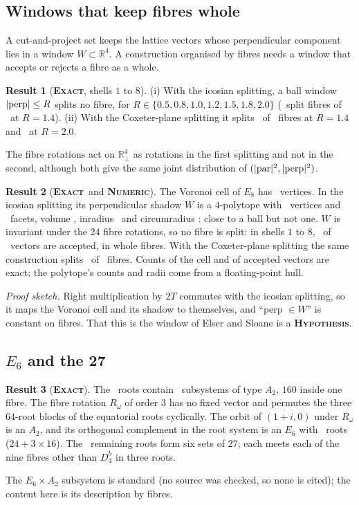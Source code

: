 \documentclass[11pt]{article}
\newcommand{\exact}{\textbf{\textsc{Exact}}}
\newcommand{\numeric}{\textbf{\textsc{Numeric}}}
\newcommand{\hypo}{\textbf{\textsc{Hypothesis}}}
\theoremstyle{definition}
\newtheorem{result}{Result}
\begin{document}
\subsection{Windows that keep fibres whole}\label{sec:windows}
A cut-and-project set keeps the lattice vectors whose perpendicular component lies in a window $W\subset\mathbb{R}^4$. A construction organised by fibres needs a window that accepts or rejects a fibre as a whole.
\begin{result}[\exact, shells $1$ to $8$]\label{res:ball}
(i) With the icosian splitting, a ball window $|{\rm perp}|\le R$ splits no fibre, for $R\in\{0.5,0.8,1.0,1.2,1.5,1.8,2.0\}$ (\qgSplitIcosian\ split fibres of \qgFibreEight\ at $R=1.4$). (ii) With the Coxeter-plane splitting it splits \qgSplitCoxOne\ of \qgFibreEight\ fibres at $R=1.4$ and \qgSplitCoxTwo\ at $R=2.0$.
\end{result}
The fibre rotations act on $\mathbb{R}^4_\perp$ as rotations in the first splitting and not in the second, although both give the same joint distribution of $(|{\rm par}|^2,|{\rm perp}|^2)$.
\begin{result}[\exact\ and \numeric]\label{res:vor}
The Voronoi cell of $E_8$ has \qgVoronoiCellVertices\ vertices. In the icosian splitting its perpendicular shadow $W$ is a $4$-polytope with \qgVoronoiVertices\ vertices and \qgVoronoiFacets\ facets, volume \qgVoronoiVolume, inradius \qgVoronoiIn\ and circumradius \qgVoronoiCirc: close to a ball but not one. $W$ is invariant under the $24$ fibre rotations, so no fibre is split: in shells $1$ to $8$, \qgVorAccepted\ of \qgVecEight\ vectors are accepted, in whole fibres. With the Coxeter-plane splitting the same construction splits \qgVorCoxSplit\ of \qgFibreEight\ fibres. Counts of the cell and of accepted vectors are exact; the polytope's counts and radii come from a floating-point hull.
\end{result}
\emph{Proof sketch.} Right multiplication by $2T$ commutes with the icosian splitting, so it maps the Voronoi cell and its shadow to themselves, and ``perp $\in W$'' is constant on fibres. That this is the window of Elser and Sloane is a \hypo.

\subsection{\texorpdfstring{$E_6$}{E6} and the 27}\label{sec:e6}
\begin{result}[\exact]\label{res:e6}
The \qgRoots\ roots contain \qgASubsystems\ subsystems of type $A_2$, $160$ inside one fibre. The fibre rotation $R_\omega$ of order $3$ has no fixed vector and permutes the three $64$-root blocks of the equatorial roots cyclically. The orbit of $(1+i,0)$ under $R_\omega$ is an $A_2$, and its orthogonal complement in the root system is an $E_6$ with \qgESixRoots\ roots ($24+3\times16$). The \qgRest\ remaining roots form six sets of $27$; each meets each of the nine fibres other than $D_4^b$ in three roots.
\end{result}
The $E_6\times A_2$ subsystem is standard (no source was checked, so none is cited); the content here is its description by fibres.
\end{document}
